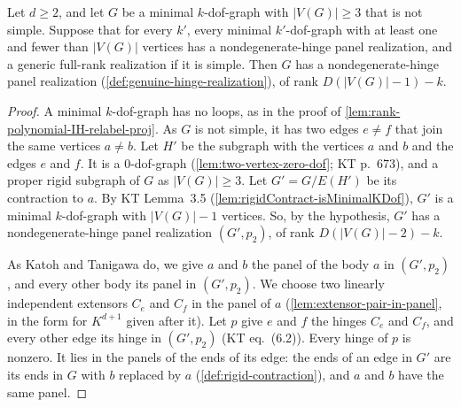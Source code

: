 \begin{lemma}
  \label{lem:case-I-realization-nonsimple}
  \leanok
  Let $d \ge 2$, and let $G$ be a minimal $k$-dof-graph with
  $|V(G)| \ge 3$ that is not simple. Suppose that for every $k'$, every
  minimal $k'$-dof-graph with at least one and fewer than $|V(G)|$
  vertices has a nondegenerate-hinge panel realization, and a generic
  full-rank realization if it is simple. Then $G$ has a
  nondegenerate-hinge panel realization
  (\cref{def:genuine-hinge-realization}), of rank $D(|V(G)| - 1) - k$.
\end{lemma}
\begin{proof}
  \leanok
  A minimal $k$-dof-graph has no loops, as in the proof of
  \cref{lem:rank-polynomial-IH-relabel-proj}. As $G$ is not simple, it
  has two edges $e \neq f$ that join the same vertices $a \neq b$. Let
  $H'$ be the subgraph with the vertices $a$ and $b$ and the edges $e$
  and $f$. It is a $0$-dof-graph (\cref{lem:two-vertex-zero-dof}; KT
  p.~673), and a proper rigid subgraph of $G$ as $|V(G)| \ge 3$. Let
  $G' = G/E(H')$ be its contraction to $a$. By KT Lemma~3.5
  (\cref{lem:rigidContract-isMinimalKDof}), $G'$ is a minimal
  $k$-dof-graph with $|V(G)| - 1$ vertices. So, by the hypothesis, $G'$
  has a nondegenerate-hinge panel realization $(G', p_2)$, of rank
  $D(|V(G)| - 2) - k$.

  As Katoh and Tanigawa do, we give $a$ and $b$ the panel of the body
  $a$ in $(G', p_2)$, and every other body its panel in $(G', p_2)$. We
  choose two linearly independent extensors $C_e$ and $C_f$ in the panel
  of $a$ (\cref{lem:extensor-pair-in-panel}, in the form for $K^{d+1}$
  given after it). Let $p$ give $e$ and $f$ the hinges $C_e$ and $C_f$,
  and every other edge its hinge in $(G', p_2)$ (KT eq.~(6.2)). Every
  hinge of $p$ is nonzero. It lies in the panels of the ends of its edge:
  the ends of an edge in $G'$ are its ends in $G$ with $b$ replaced by
  $a$ (\cref{def:rigid-contraction}), and $a$ and $b$ have the same
  panel.


\end{proof}
